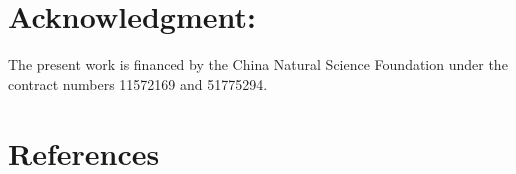 \documentclass[preprint,5p,twocolumn,10pt,sort&compress]{elsarticle}
\begin{document}
\section*{Acknowledgment:} The present work is financed by the China Natural Science Foundation under the contract numbers 11572169 and 51775294.

\section*{References}

\end{document}
